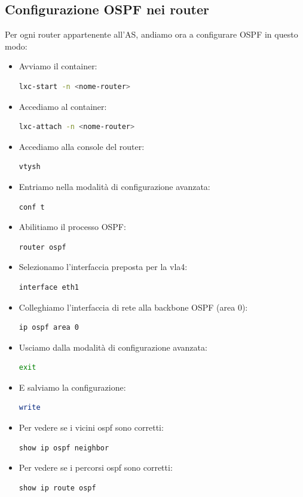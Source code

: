 \documentclass[12pt,a4paper,twoside]{book}
\begin{document}
\subsection{Configurazione OSPF nei router}
Per ogni router appartenente all'\ac{AS}, andiamo ora a configurare \ac{OSPF} in questo modo:
\begin{itemize}
    \item Avviamo il container:
    \begin{lstlisting}[language=bash]
lxc-start -n <nome-router>
    \end{lstlisting}
    \item Accediamo al container:
    \begin{lstlisting}[language=bash]
lxc-attach -n <nome-router>
    \end{lstlisting}
    \item Accediamo alla console del router:
    \begin{lstlisting}[language=bash]
vtysh
    \end{lstlisting}
    \item Entriamo nella modalità di configurazione avanzata:
    \begin{lstlisting}[language=bash]
conf t
    \end{lstlisting}
    \item Abilitiamo il processo \ac{OSPF}:
    \begin{lstlisting}[language=bash]
router ospf
    \end{lstlisting}
    \item Selezionamo l'interfaccia preposta per la vla4:
    \begin{lstlisting}[language=bash]
interface eth1
    \end{lstlisting}
    \item Colleghiamo l'interfaccia di rete alla backbone \ac{OSPF} (area 0):
    \begin{lstlisting}[language=bash]
ip ospf area 0
    \end{lstlisting}
    \item Usciamo dalla modalità di configurazione avanzata:
    \begin{lstlisting}[language=bash]
exit
    \end{lstlisting}
    \item E salviamo la configurazione:
    \begin{lstlisting}[language=bash]
write
    \end{lstlisting}
    \item Per vedere se i vicini ospf sono corretti:
    \begin{lstlisting}[language=bash]
show ip ospf neighbor
    \end{lstlisting}
    \item Per vedere se i percorsi ospf sono corretti:
    \begin{lstlisting}[language=bash]
show ip route ospf
    \end{lstlisting}
\end{itemize}
\end{document}
